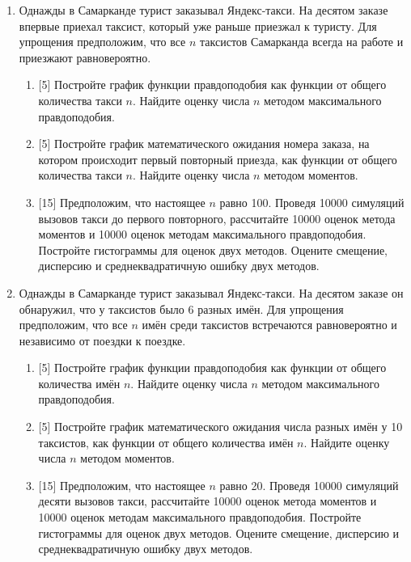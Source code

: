 \documentclass[12pt]{article} %
\begin{document}
\begin{enumerate}

    \item Однажды в Самарканде турист заказывал Яндекс-такси. 
    На десятом заказе впервые приехал таксист, который уже раньше приезжал к туристу. 
    Для упрощения предположим, что все $n$ таксистов Самарканда всегда на работе и приезжают равновероятно.

    \begin{enumerate}
      \item {[5]} Постройте график функции правдоподобия как функции от общего количества такси $n$. 
      Найдите оценку числа $n$ методом максимального правдоподобия. 
      \item {[5]} Постройте график математического ожидания номера заказа, 
      на котором происходит первый повторный приезда, как функции от общего количества такси $n$. 
      Найдите оценку числа $n$ методом моментов.
      \item {[15]} Предположим, что настоящее $n$ равно 100. 
      Проведя 10000 симуляций вызовов такси до первого повторного, рассчитайте 10000 оценок метода моментов и 10000 оценок методам максимального правдоподобия. 
      Постройте гистограммы для оценок двух методов. 
      Оцените смещение, дисперсию и среднеквадратичную ошибку двух методов. 
    \end{enumerate}

    \item Однажды в Самарканде турист заказывал Яндекс-такси. 
    На десятом заказе он обнаружил, что у таксистов было 6 разных имён.
    Для упрощения предположим, что все $n$ имён среди таксистов встречаются равновероятно и независимо от 
    поездки к поездке. 

    \begin{enumerate}
      \item {[5]} Постройте график функции правдоподобия как функции от общего количества имён $n$. 
      Найдите оценку числа $n$ методом максимального правдоподобия. 
      \item {[5]} Постройте график математического ожидания числа разных имён у 10 таксистов, 
      как функции от общего количества имён $n$. 
      Найдите оценку числа $n$ методом моментов.
      \item {[15]} Предположим, что настоящее $n$ равно 20. 
      Проведя 10000 симуляций десяти вызовов такси, рассчитайте 10000 оценок метода моментов и 10000 оценок методам максимального правдоподобия. 
      Постройте гистограммы для оценок двух методов. 
      Оцените смещение, дисперсию и среднеквадратичную ошибку двух методов. 
    \end{enumerate}


\end{enumerate}
\end{document}
